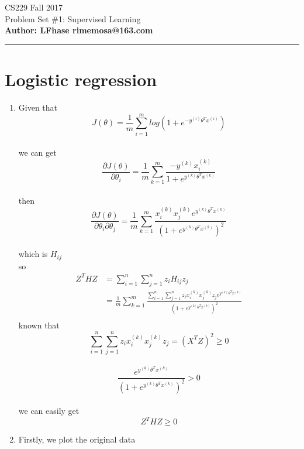 \documentclass[12pt]{article}
\begin{document}
    \begin{flushleft}
    \LARGE CS229 Fall 2017\\
    \LARGE Problem Set \#1: Supervised Learning\\
    \textbf{\normalsize Author: LFhase \quad rimemosa@163.com}
    \end{flushleft} 
    \noindent
    \rule{\linewidth}{0.4pt}


    \section*{Logistic regression  }

    \begin{enumerate}[label=(\alph*)]

    \item 
    {
        Given that \\
        $$J(\theta)= \frac{1}{m} \sum_{i=1}^{m}log(1+e^{-y^{(i)}\theta^{T}x^{(i)}})$$\\
        we can get
        $$\frac{\partial J(\theta)}{\partial \theta_{i}}
            =  \frac{1}{m} \sum_{k=1}^{m} \frac{-y^{(k)}x^{(k)}_i}{1+e^{y^{(k)}\theta^{T}x^{(k)}}}
        $$\\
        then
        $$\frac{\partial J(\theta)}{\partial \theta_{i} \partial \theta_{j}}
            =  \frac{1}{m} \sum_{k=1}^{m} 
            \frac{x^{(k)}_ix^{(k)}_je^{y^{(k)}\theta^{T}x^{(k)}}}
            {(1+e^{y^{(k)}\theta^{T}x^{(k)}})^2}
        $$\\
        which is $ H_{ij} $\\
        so
        \begin{equation*} 
        \begin{split}
            Z^THZ &= \sum_{i=1}^n \sum_{j=1}^n z_iH_{ij}z_j \\
            &= \frac{1}{m} \sum_{k=1}^{m} 
            \frac{\sum_{i=1}^n \sum_{j=1}^n z_ix^{(k)}_ix^{(k)}_jz_je^{y^{(k)}\theta^{T}x^{(k)}}}{(1+e^{y^{(k)}\theta^{T}x^{(k)}})^2}
            \\
        \end{split}
        \end{equation*} 
        known that 
        $$ \sum_{i=1}^n \sum_{j=1}^n z_ix^{(k)}_ix^{(k)}_jz_j = (X^TZ)^2 \geq 0 $$\\
        $$ \frac{e^{y^{(k)}\theta^{T}x^{(k)}}}{(1+e^{y^{(k)}\theta^{T}x^{(k)}})^2} > 0 $$\\
        we can easily get $$ Z^THZ \geq 0 $$
    }
    \newpage
    \item 
    {
        Firstly, we plot the original data \\

}
\end{enumerate}
\end{document}
